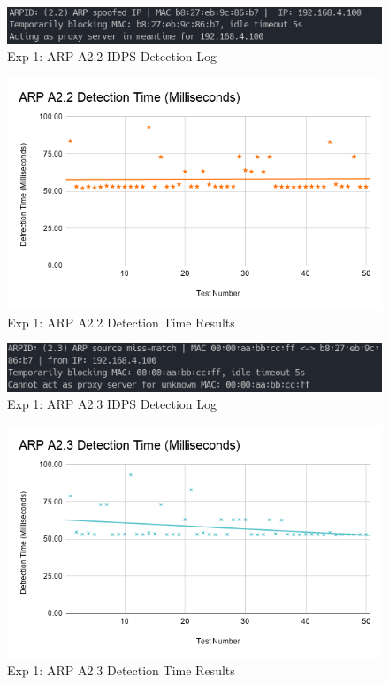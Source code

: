 \documentclass[12pt, oneside]{book}
\begin{document}
\begin{figure}[H]
	\centering
	\includegraphics[scale=0.7]{../tests/a22/IDPSCap.png}
	\caption{Exp 1: ARP A2.2 IDPS Detection Log}
	\label{fig:arpa22l}
\end{figure}
\begin{figure}[H]
	\centering
	\includegraphics[scale=0.65]{../tests/aAll/ARP_A2.2_Detection_Time_(Milliseconds)_.png}
	\caption{Exp 1: ARP A2.2 Detection Time Results}
	\label{fig:arpa22g}
\end{figure}

\begin{figure}[H]
	\centering
	\includegraphics[scale=0.7]{../tests/a23/IDPSCap.png}
	\caption{Exp 1: ARP A2.3 IDPS Detection Log}
	\label{fig:arpa23l}
\end{figure}
\begin{figure}[H]
	\centering
	\includegraphics[scale=0.65]{../tests/aAll/ARP_A2.3_Detection_Time_(Milliseconds)_.png}
	\caption{Exp 1: ARP A2.3 Detection Time Results}
	\label{fig:arpa23g}
\end{figure}
\end{document}
